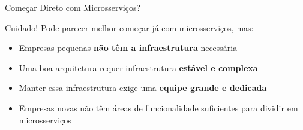 \documentclass[aspectratio=169]{beamer}
\begin{document}
\begin{frame}{Começar Direto com Microsserviços?}
    \begin{alertblock}{Cuidado!}
        Pode parecer melhor começar já com microsserviços, mas:
    \end{alertblock}
    \vspace{0.3cm}
    \begin{itemize}
        \item Empresas pequenas \textbf{não têm a infraestrutura} necessária
        \item Uma boa arquitetura requer infraestrutura \textbf{estável e complexa}
        \item Manter essa infraestrutura exige uma \textbf{equipe grande e dedicada}
        \item Empresas novas não têm áreas de funcionalidade suficientes para dividir em microsserviços
    \end{itemize}
    \vspace{0.3cm}
    \begin{center}
    \end{center}
\end{frame}
\end{document}
